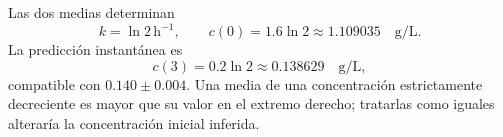 Las dos medias determinan
\[
k=\ln2\,\mathrm h^{-1},\qquad
c(0)=1.6\ln2\approx1.109035\quad\mathrm{g/L}.
\]
La predicción instantánea es
\[
c(3)=0.2\ln2\approx0.138629\quad\mathrm{g/L},
\]
compatible con \(0.140\pm0.004\). Una media de una concentración estrictamente decreciente es mayor que su valor en el extremo derecho; tratarlas como iguales alteraría la concentración inicial inferida.
